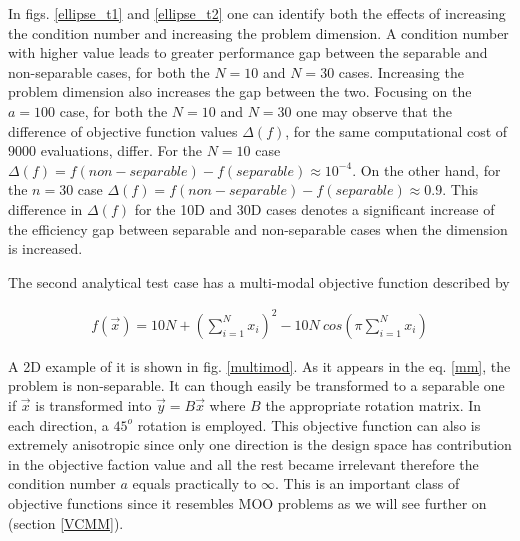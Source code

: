 In figs. \ref{ellipse_t1} and \ref{ellipse_t2} one can identify both the effects of increasing the condition number and increasing the problem dimension. A condition number with higher value leads to greater performance gap between the separable and non-separable cases, for both the $N\!=\!10$ and $N\!=\!30$ cases. Increasing the problem dimension also increases the gap between the two. Focusing on the $a\!=\!100$ case, for both the $N\!=\!10$ and $N\!=\!30$ one may observe that the difference of objective function values $\Delta(f)$, for the same computational cost of $9000$ evaluations, differ. For the $N\!=\!10$ case $\Delta(f)\!=\!f(non-separable)-f(separable) \approx  10^{-4}$. On the other hand, for the $n=30$ case $\Delta(f)\!=\!f(non-separable)-f(separable) \approx  0.9$. This difference in $\Delta(f)$ for the 10D and 30D cases denotes a significant increase of the efficiency gap between separable and non-separable cases when the dimension is increased.      

The second analytical test case has a multi-modal objective function described by  

\begin{eqnarray}
   f(\vec{x})=10N+(\sum^{N}_{i=1}x_i)^2 - 10N~ cos(\pi  \sum^{N}_{i=1}x_i)
   \label{mm} 
\end{eqnarray}

A 2D example of it is shown in fig. \ref{multimod}. As it appears in the eq. \ref{mm}, the problem is non-separable. It can though easily be transformed to a separable one if $\vec{x}$ is transformed into $\vec{y}=B\vec{x}$ where $B$ the appropriate rotation matrix.  In each direction, a $45^o$ rotation is employed.  This objective function can also is extremely anisotropic since only one direction is the design space has contribution in the objective faction value and all the rest became irrelevant therefore the condition number $a$ equals practically to $\infty$. This is an important class of objective functions since it resembles MOO problems as we will see further on (section \ref{VCMM}).    

